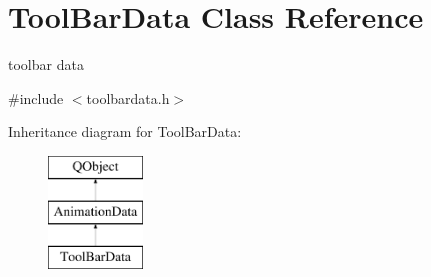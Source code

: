\hypertarget{class_tool_bar_data}{}\section{Tool\+Bar\+Data Class Reference}
\label{class_tool_bar_data}


toolbar data  




{\ttfamily \#include $<$toolbardata.\+h$>$}

Inheritance diagram for Tool\+Bar\+Data\+:\begin{figure}[H]
\begin{center}
\leavevmode
\includegraphics[height=3.000000cm]{class_tool_bar_data}
\end{center}
\end{figure}
